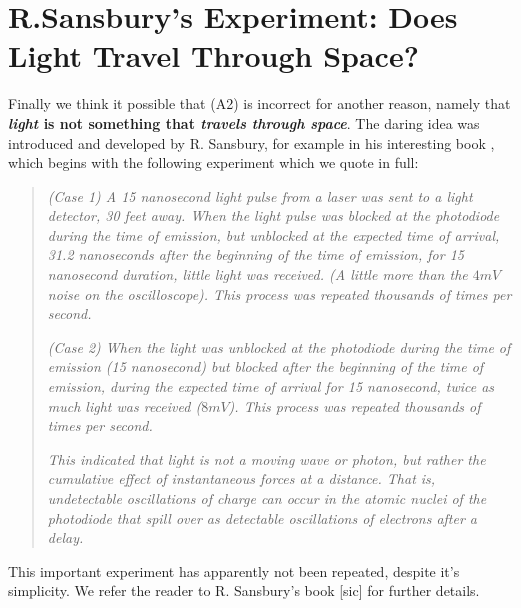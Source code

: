 \documentclass[12pt]{amsart}
\theoremstyle{definition}
\theoremstyle{remark}
\begin{document}
\section{R.Sansbury's Experiment: Does Light Travel Through Space?}
Finally we think it possible that (A2) is incorrect for another reason, namely that \textbf{\emph{light} is not something that \emph{travels through space}}. The daring idea was introduced and developed by R. Sansbury, for example in his interesting book \cite{sansburyspeed}, which begins with the following experiment which we quote in full:
\begin{quote}
\emph{ (Case 1) A 15 nanosecond light pulse from a laser was sent to a light detector, 30 feet away. When the light pulse was blocked at the photodiode during the time of emission, but unblocked at the expected time of arrival, 31.2 nanoseconds after the beginning of the time of emission, for 15 nanosecond duration, little light was received. (A little more than the $4mV$ noise on the oscilloscope). This process was repeated thousands of times per second.}

\emph{(Case 2) When the light was unblocked at the photodiode during the time of emission (15 nanosecond) but blocked after the beginning of the time of emission, during the expected time of arrival for 15 nanosecond, twice as much light was received ($8mV$). This process was repeated thousands of times per second.}

\emph{This indicated that light is not a moving wave or photon, but rather the cumulative effect of instantaneous forces at a distance. That is, undetectable oscillations of charge can occur in the atomic nuclei of the photodiode that spill over as detectable oscillations of electrons after a delay.}
\end{quote}

This important experiment has apparently not been repeated, despite it's simplicity. We refer the reader to R. Sansbury's book [sic] for further details. 

\end{document}
